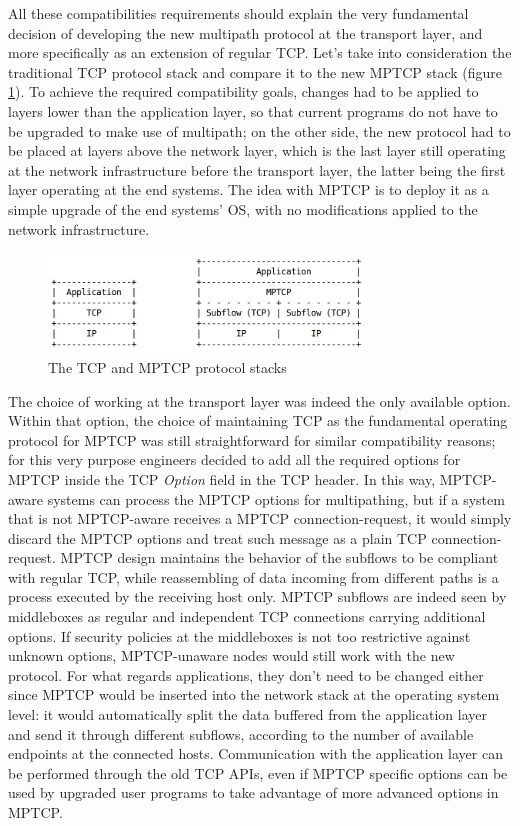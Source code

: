All these compatibilities requirements should explain the very fundamental decision of developing the new multipath protocol at the transport layer, and more specifically as an extension of regular TCP. Let's take into consideration the traditional TCP protocol stack and compare it to the new MPTCP stack (figure \ref{fig:stack}).
To achieve the required compatibility goals, changes had to be applied to layers lower than the application layer, so that current programs do not have to be upgraded to make use of multipath; on the other side, the new protocol had to be placed at layers above the network layer, which is the last layer still operating at the network infrastructure before the transport layer, the latter being the first layer operating at the end systems. The idea with MPTCP is to deploy it as a simple upgrade of the end systems' OS, with no modifications applied to the network infrastructure.

\begin{figure}[!htb]
\centering
\includegraphics[width=0.75\textwidth]{images/stack}
\caption{The TCP and MPTCP protocol stacks}
\label{fig:stack}
\end{figure}

The choice of working at the transport layer was indeed the only available option. Within that option, the choice of maintaining TCP as the fundamental operating protocol for MPTCP was still straightforward for similar compatibility reasons; for this very purpose engineers decided to add all the required options for MPTCP inside the TCP \textit{Option} field in the TCP header. In this way, MPTCP-aware systems can process the MPTCP options for multipathing, but if a system that is not MPTCP-aware receives a MPTCP connection-request, it would simply discard the MPTCP options and treat such message as a plain TCP connection-request. 
MPTCP design maintains the behavior of the subflows to be compliant with regular TCP, while reassembling of data incoming from different paths is a process executed by the receiving host only. MPTCP subflows are indeed seen by middleboxes as regular and independent TCP connections carrying additional options. If security policies at the middleboxes is not too restrictive against unknown options, MPTCP-unaware nodes would still work with the new protocol.
For what regards applications, they don't need to be changed either since MPTCP would be inserted into the network stack at the operating system level: it would automatically split the data buffered from the application layer and send it through different subflows, according to the number of available endpoints at the connected hosts. Communication with the application layer can be performed through the old TCP APIs, even if MPTCP specific options can be used by upgraded user programs to take advantage of more advanced options in MPTCP.

